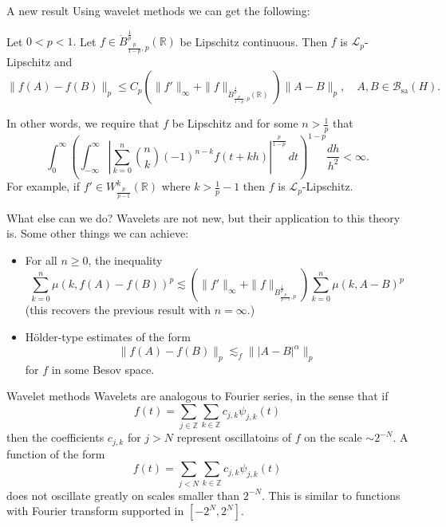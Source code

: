 \documentclass{beamer}
\numberwithin{equation}{section}
\theoremstyle{plain}
\theoremstyle{plain}
\theoremstyle{definition}
\theoremstyle{plain}
\theoremstyle{plain}
\theoremstyle{definition}
\newcommand{\Rl}{\mathbb{R}}
\newcommand{\Itgr}{\mathbb{Z}}
\newcommand{\Bc}{\mathcal{B}}
\newcommand{\Lc}{\mathcal{L}}
\newcommand{\sa}{\mathrm{sa}}
\begin{document}
\begin{frame}{A new result}
    Using wavelet methods we can get the following:
    \begin{theorem}
        Let $0 < p < 1.$ Let $f \in \dot{B}^{\frac1p}_{\frac{p}{1-p},p}(\Rl)$ be Lipschitz continuous. Then $f$ is $\Lc_p$-Lipschitz and
        $$
            \|f(A)-f(B)\|_p \leq C_{p}(\|f'\|_\infty+\|f\|_{\dot{B}^{\frac1p}_{\frac{p}{1-p},p}(\Rl)})\|A-B\|_p,\quad A,B\in \Bc_{\sa}(H).
        $$
    \end{theorem}
    \pause
    In other words, we require that $f$ be Lipschitz and for some $n>\frac1p$ that
    \begin{equation*}
        \int_0^\infty \left(\int_{-\infty}^\infty \left|\sum_{k=0}^n \binom{n}{k}(-1)^{n-k}f(t+kh)\right|^{\frac{p}{1-p}}\,dt\right)^{1-p} \frac{dh}{h^2} < \infty.
    \end{equation*}
    \pause
    For example, if $f' \in W^{k}_{\frac{p}{p-1}}(\Rl)$ where $k > \frac{1}{p}-1$ then $f$ is $\Lc_p$-Lipschitz.
\end{frame}

\begin{frame}{What else can we do?}
    Wavelets are not new, but their application to this theory is. \pause
    Some other things we can achieve:
    \begin{itemize}
        \item{} For all $n\geq 0$, the inequality
        $$
            \sum_{k=0}^n \mu(k,f(A)-f(B))^p \lesssim (\|f'\|_\infty+\|f\|_{\dot{B}^{\frac{1}{p}}_{\frac{p}{p-1},p}})\sum_{k=0}^n \mu(k,A-B)^p
        $$
        (this recovers the previous result with $n=\infty.$)\pause
        \item{} H\"older-type estimates of the form
        $$
            \|f(A)-f(B)\|_{p} \lesssim_f \||A-B|^{\alpha}\|_p
        $$
        for $f$ in some Besov space.
    \end{itemize}
\end{frame}

\begin{frame}{Wavelet methods}
    Wavelets are analogous to Fourier series, in the sense that if
    \[
        f(t) = \sum_{j\in \Itgr} \sum_{k\in \Itgr} c_{j,k}\psi_{j,k}(t)
    \]
    then the coefficients $c_{j,k}$ for $j>N$ represent oscillatoins of $f$ on the scale $\sim 2^{-N}.$ A function of the form
    \[
        f(t) = \sum_{j<N} \sum_{k\in \Itgr}c_{j,k}\psi_{j,k}(t)
    \]
    does not oscillate greatly on scales smaller than $2^{-N}.$ This is similar to functions with Fourier transform supported in $[-2^N,2^N].$
\end{frame}
\end{document}
